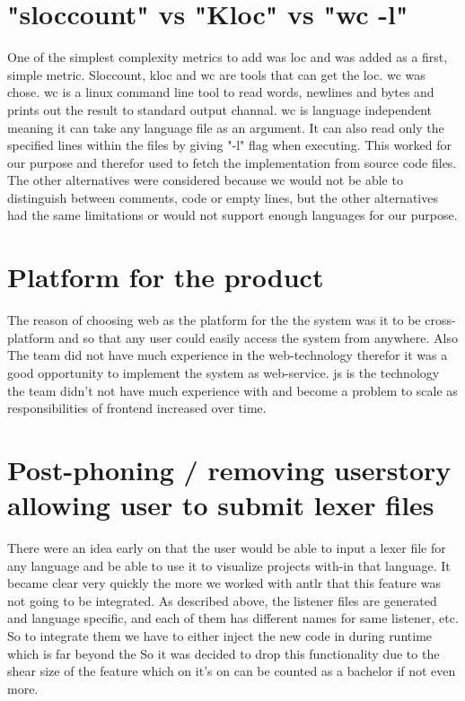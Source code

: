 \section{"sloccount" vs "Kloc" vs "wc -l"}
One of the simplest complexity metrics to add was \gls{loc} and was added as a first, simple metric. Sloccount, kloc and wc are tools that can get the \gls{loc}. wc was chose. 
wc is a linux command line tool to read words, newlines and bytes and prints out the result to standard output channal. wc is language independent meaning it can take any language file as an argument. It can also read only the specified lines within the files by giving "-l" flag when executing. This worked for our purpose and therefor used to fetch the implementation from source code files. The other alternatives were considered because wc would not be able to distinguish between comments, code or empty lines, but the other alternatives had the same limitations or would not support enough languages for our purpose. 

\section{Platform for the product}
The reason of choosing web as the platform for the the system was it to be cross-platform and so that any user could easily access the system from anywhere. Also The team did not have much experience in the web-technology therefor it was a good opportunity to implement the system as web-service.
\gls{js} is the technology the team didn't not have much experience with and become a problem to scale as responsibilities of \gls{frontend} increased over time.

\section{Post-phoning / removing userstory allowing user to submit lexer files}
There were an idea early on that the user would be able to input a lexer file for any language and be able to use it to visualize projects with-in that language. It became clear very quickly the more we worked with \gls{antlr} that this feature was not going to be integrated. As described above, the listener files are generated and language specific, and each of them has different names for same listener, etc.
So to integrate them we have to either inject the new code in during runtime which is far beyond the 
So it was decided to drop this functionality due to the shear size of the feature which on it's on can be counted as a bachelor if not even more.